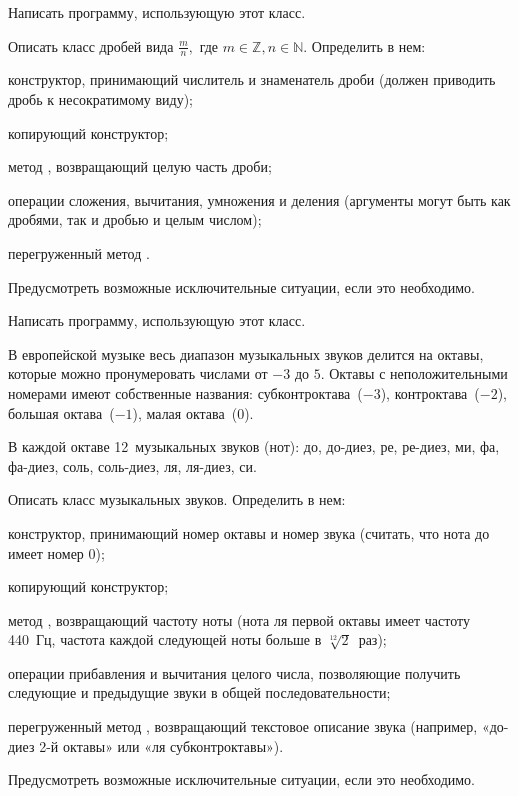 Написать программу, использующую этот класс.

\task Описать класс  дробей вида $\frac{m}{n},$ где
$m \in \mathbb{Z}, n \in \mathbb{N}$.  Определить в нем:
\begin{itemize*}
\item конструктор, принимающий числитель и знаменатель дроби (должен
  приводить дробь к несократимому виду);
\item копирующий конструктор;
\item метод , возвращающий целую часть дроби;
\item операции сложения, вычитания, умножения и деления (аргументы
  могут быть как дробями, так и дробью и целым числом);
\item перегруженный метод .
\end{itemize*}

Предусмотреть возможные исключительные ситуации, если это необходимо.

Написать программу, использующую этот класс.

\task В европейской музыке весь диапазон музыкальных звуков делится на
октавы, которые можно пронумеровать числами от $-3$ до $5$. Октавы с
неположительными номерами имеют собственные названия:
субконтроктава~($-3$), контроктава~($-2$), большая октава~($-1$),
малая октава~($0$).

В каждой октаве 12~музыкальных звуков (нот): до, до-диез, ре, ре-диез,
ми, фа, фа-диез, соль, соль-диез, ля, ля-диез, си.

Описать класс  музыкальных звуков. Определить в нем:
\begin{itemize*}
\item конструктор, принимающий номер октавы и номер звука (считать,
  что нота до имеет номер $0$);
\item копирующий конструктор;
\item метод , возвращающий частоту ноты (нота ля первой
  октавы имеет частоту 440~Гц, частота каждой следующей ноты больше в
  $\sqrt[12]{2}$~раз);
\item операции прибавления и вычитания целого числа, позволяющие
  получить следующие и предыдущие звуки в общей последовательности;
\item перегруженный метод , возвращающий текстовое
  описание звука (например, «до-диез 2-й октавы» или «ля
  субконтроктавы»).
\end{itemize*}

Предусмотреть возможные исключительные ситуации, если это необходимо.


